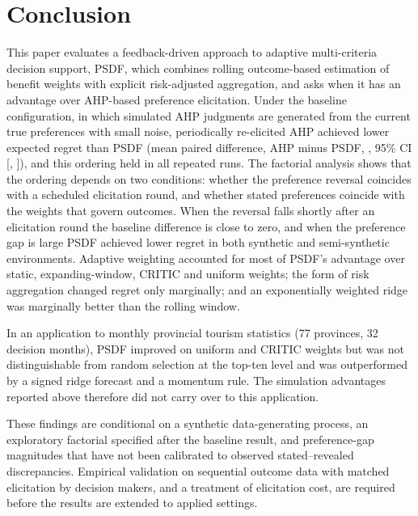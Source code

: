 \documentclass[12pt,a4paper]{article}
\begin{document}
\section{Conclusion}
This paper evaluates a feedback-driven approach to adaptive multi-criteria decision support, PSDF, which combines rolling outcome-based estimation of benefit weights with explicit risk-adjusted aggregation, and asks when it has an advantage over AHP-based preference elicitation. Under the baseline configuration, in which simulated AHP judgments are generated from the current true preferences with small noise, periodically re-elicited AHP achieved lower expected regret than PSDF (mean paired difference, AHP minus PSDF, \DiffAHPTen, 95\% CI [\DiffAHPTenLo, \DiffAHPTenHi]), and this ordering held in all \RobSeeds{} repeated runs. The factorial analysis shows that the ordering depends on two conditions: whether the preference reversal coincides with a scheduled elicitation round, and whether stated preferences coincide with the weights that govern outcomes. When the reversal falls shortly after an elicitation round the baseline difference is close to zero, and when the preference gap is large PSDF achieved lower regret in both synthetic and semi-synthetic environments. Adaptive weighting accounted for most of PSDF's advantage over static, expanding-window, CRITIC and uniform weights; the form of risk aggregation changed regret only marginally; and an exponentially weighted ridge was marginally better than the rolling window.

In an application to monthly provincial tourism statistics (77 provinces, 32 decision months), PSDF improved on uniform and CRITIC weights but was not distinguishable from random selection at the top-ten level and was outperformed by a signed ridge forecast and a momentum rule. The simulation advantages reported above therefore did not carry over to this application.

These findings are conditional on a synthetic data-generating process, an exploratory factorial specified after the baseline result, and preference-gap magnitudes that have not been calibrated to observed stated--revealed discrepancies. Empirical validation on sequential outcome data with matched elicitation by decision makers, and a treatment of elicitation cost, are required before the results are extended to applied settings.
\end{document}

